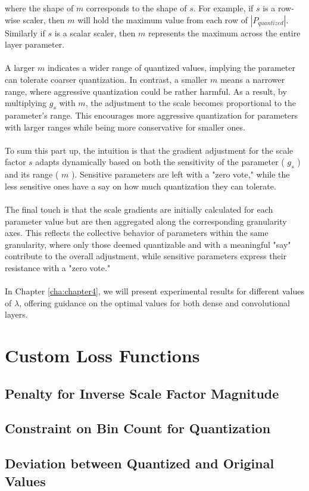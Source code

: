 \noindent where the shape of \( m \) corresponds to the shape of \( s \).
For example, if \( s \) is a row-wise scaler, then \( m  \) will hold
the maximum value from each row of \( \left| P_{quantized} \right|\).
Similarly if  \( s \) is a scalar scaler, then \( m \) represents
the maximum across the entire layer parameter.
\\
\\
A larger \( m \) indicates a wider range of quantized values,
implying the parameter can tolerate coarser quantization.
In contrast, a smaller \( m \) means a narrower range,
where aggressive quantization could be rather harmful.
As a result, by multiplying \( g_s\) with \( m \), 
the adjustment to the scale becomes proportional to the parameter's range.
This encourages more aggressive quantization for parameters with larger ranges
while being more conservative for smaller ones.
\\
\\
To sum this part up, the intuition is that the gradient adjustment for the scale factor
\( s \) adapts dynamically based on both the sensitivity of the parameter ( \( g_s\) )
and its range ( \( m \) ). Sensitive parameters are left with a "zero vote,"
while the less sensitive ones have a say on how much quantization they can tolerate.
\\
\\
The final touch is that the scale gradients are initially calculated for each parameter value
but are then aggregated along the corresponding granularity axes.
This reflects the collective behavior of parameters within the same granularity,
where only those deemed quantizable and with a meaningful "say" contribute to the overall adjustment,
while sensitive parameters express their resistance with a "zero vote."
\\
\\
In Chapter \ref{cha:chapter4}, we will present experimental results for different values of 
\( \lambda \), offering guidance on the optimal values for both dense and convolutional layers.


\section{Custom Loss Functions}
\label{sec:customloss}

\subsection{Penalty for Inverse Scale Factor Magnitude} 
\label{subsec:scaleinverse}

\subsection{Constraint on Bin Count for Quantization}
\label{subsec:maxbin}

\subsection{Deviation between Quantized and Original Values}
\label{subsec:difference}